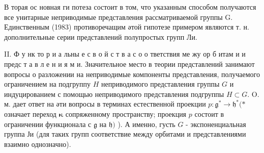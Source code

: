 \documentclass[10pt]{article}
\begin{document}
В торая ос новная ги потеза состоит в том, что указанным способом получаются все унитарные неприводимые представления рассматриваемой группы G. Единственным (1983) противоречащим әтой гипотезе примером являются т. н. дополнительные серии представлений полупростых групп Ли.



II. Ф у нк то р и а льны е с в о й с т в а с о о тветствия ме жу ор б итам и и предс т а в л е н и я м и. Значительное место в теории представлений занимают вопросы о разложении на неприводимые компоненты представления, получаемого ограничением на подгруппу $H$ неприводимого представления группы $G$ и индуцированием с помощью неприводимого представления подгруппы $H \subset G$. O. м. дает ответ на әти вопросы в терминах естественной проекции $p: \mathfrak{g}^{*} \rightarrow \mathfrak{h}^{*}(*$ означает переход $\boldsymbol{\kappa}$ сопряженному пространству; проекция $p$ состоит в ограничении функционала с $\mathfrak{g}$ на $\mathfrak{h})$ ). А именно, густь $G$ - экспоненциальная группа Ји (для таких групп соответствие между орбитами и представлениями взаимно однозначно).
\end{document}

